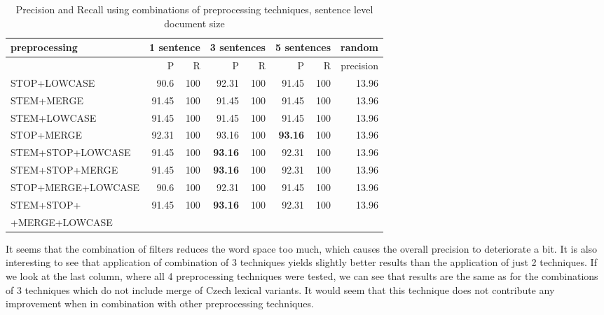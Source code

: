  \begin{table}[h!]
\begin{footnotesize}
\begin{tabular}{ l | r r | r r | r r | r}
preprocessing & \multicolumn{2}{l|}{1 sentence} & \multicolumn{2}{l|}{3 sentences} & \multicolumn{2}{l|}{5 sentences} & random\\
\hline
	& P  &  R & P  &  R & P  &  R & precision\\
\hline\hline
STOP+LOWCASE  & 90.6 & 100 & 92.31 & 100 & 91.45 & 100 & 13.96\\
 STEM+MERGE  & 91.45 & 100 & 91.45 & 100 & 91.45 & 100 & 13.96 \\
 STEM+LOWCASE  & 91.45 & 100 & 91.45 & 100 & 91.45 & 100 & 13.96 \\
 STOP+MERGE  & 92.31 & 100 & 93.16 & 100 & \textbf{93.16} & 100 & 13.96 \\
STEM+STOP+LOWCASE  & 91.45 & 100 & \textbf{93.16} & 100 & 92.31 & 100 & 13.96 \\
STEM+STOP+MERGE  & 91.45 & 100 & \textbf{93.16} & 100 & 92.31 & 100 & 13.96 \\
STOP+MERGE+LOWCASE  & 90.6 & 100 & 92.31 & 100 & 91.45 & 100 & 13.96 \\
STEM+STOP+& 91.45 & 100 & \textbf{93.16} & 100 & 92.31 & 100 & 13.96 \\
+MERGE+LOWCASE  &&&&&&&\\
\end{tabular}
\caption{Precision and Recall using combinations of preprocessing techniques, sentence level document size}
\end{footnotesize}
\end{table}


It seems that the combination of filters reduces the word space too much, which causes the overall precision to deteriorate a bit. It is also interesting to see that application of combination of 3 techniques yields slightly better results than the application of just 2 techniques. If we look at the last column, where all 4 preprocessing techniques were tested, we can see that results are the same as for the combinations of 3 techniques which do not include merge of Czech lexical variants. It would seem that this technique does not contribute any improvement when in combination with other preprocessing techniques. 

